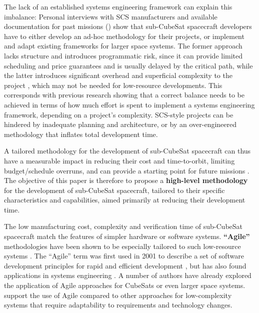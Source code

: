 \documentclass[journal,10pt]{IEEEtran}
\begin{document}
The lack of an established systems engineering framework can explain this imbalance: Personal interviews with \acs{SCS} manufacturers and available documentation for past missions () show that sub-CubeSat spacecraft developers have to either develop an ad-hoc methodology for their projects, or implement and adapt existing frameworks for larger space systems. The former approach lacks structure and introduces programmatic risk, since it can provide limited scheduling and price guarantees and is usually delayed by the critical path, while the latter introduces significant overhead and superficial complexity to the project \autocite{honourTechnicalReportValue2004}, which may not be needed for low-resource developments. This corresponds with previous research \autocite{sebok_value,boehmROISystemsEngineering2008,dillonFasterBetterCheaperProjectsToo2015} showing that a correct balance needs to be achieved in terms of how much effort is spent to implement a systems engineering framework, depending on a project's complexity. \acs{SCS}-style projects can be hindered by inadequate planning and architecture, or by an over-engineered methodology that inflates total development time.

	A tailored methodology for the development of sub-CubeSat spacecraft can thus have a measurable impact in reducing their cost and time-to-orbit, limiting budget/schedule overruns, and can provide a starting point for future missions \autocite{honourTechnicalReportValue2004,sebok_drivers}.
	The objective of this paper is therefore to propose a \textbf{high-level methodology} for the development of sub-CubeSat spacecraft, tailored to their specific characteristics and capabilities, aimed primarily at reducing their development time.

	The low manufacturing cost, complexity and verification time of sub-CubeSat spacecraft match the features of simpler hardware or software systems.
	\textbf{``Agile''} methodologies have been shown to be especially tailored to such low-resource systems \autocite{yassineInformationHidingProduct2003,boehmBalancingAgilityDiscipline2004,carsonCanSystemsEngineering2013}.
	The ``Agile'' term was first used in 2001 to describe a set of software development principles for rapid and efficient development \autocite{beckAgileManifesto2001}, but has also found applications in systems engineering \autocite{douglassAgileSystemsEngineering2015,carsonCanSystemsEngineering2013,boehmBalancingAgilityDiscipline2004,garzanitiHybridAgileProduct2020}.
	A number of authors \autocite{carpenterAgileTooFragile2014,honore-livermoreCubeSatsUniversityUsing2019} have already explored the application of Agile approaches for CubeSats or even larger space systems.
	\autocite{sebok_drivers,bottAnalysisTheoriesSupporting2019} support the use of Agile compared to other approaches for low-complexity systems that require adaptability to requirements and technology changes.
\end{document}
